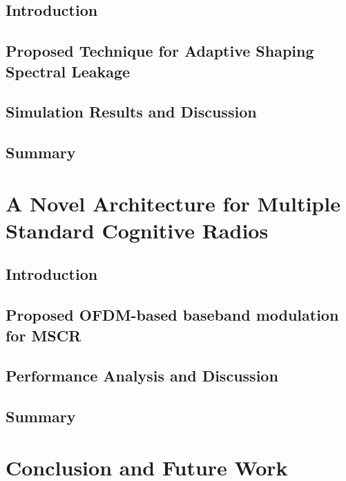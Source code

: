 	\section{Introduction}
	\section{Proposed Technique for Adaptive Shaping Spectral Leakage}
	\section{Simulation Results and Discussion}
	\section{Summary}
%
\chapter{A Novel Architecture for Multiple Standard Cognitive Radios}
\label{chap:MSCR}
	\section{Introduction}
	\section{Proposed OFDM-based baseband modulation for MSCR}
	\section{Performance Analysis and Discussion}
\section{Summary}
%
\chapter{Conclusion and Future Work}
\label{chap:conclusion}




\appendix
%

\newpage
{}








